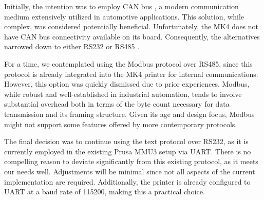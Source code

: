 Initially, the intention was to employ CAN bus \cite{can}, a modern communication medium extensively utilized in automotive applications. This solution, while complex, was considered potentially beneficial. Unfortunately, the MK4 does not have CAN bus connectivity available on its board. Consequently, the alternatives narrowed down to either RS232 or RS485 \cite{uart}.

For a time, we contemplated using the Modbus protocol \cite{modbus} over RS485, since this protocol is already integrated into the MK4 printer for internal communications. However, this option was quickly dismissed due to prior experiences. Modbus, while robust and well-established in industrial automation, tends to involve substantial overhead both in terms of the byte count necessary for data transmission and its framing structure. Given its age and design focus, Modbus might not support some features offered by more contemporary protocols.

The final decision was to continue using the text protocol over RS232, as it is currently employed in the existing Prusa MMU3 setup via UART. There is no compelling reason to deviate significantly from this existing protocol, as it meets our needs well. Adjustments will be minimal since not all aspects of the current implementation are required. Additionally, the printer is already configured to UART at a baud rate of 115200, making this a practical choice.
